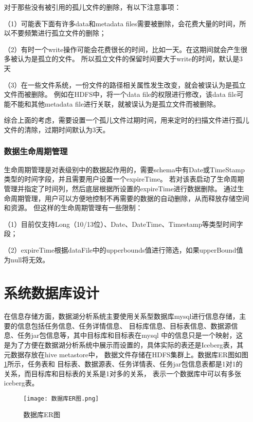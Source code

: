 对于那些没有被引用的孤儿文件的删除，有以下注意事项：

（1）可能表下面有许多data和metadata files需要被删除，会花费大量的时间，所以不要频繁进行孤立文件的删除；

（2）有时一个write操作可能会花费很长的时间，比如一天。在这期间就会产生很多被认为是孤立的文件。
所以孤立文件的保留时间要大于write的时间，默认是3天

（3）在一些文件系统，一份文件的路径相关属性发生改变，就会被误认为是孤立文件而被删除。
例如在HDFS中，将一个data file的权限进行修改，该data file可能不能和其他metadata file进行关联，就被误认为是孤立文件而被删除。

综合上面的考虑，需要设置一个孤儿文件过期时间，用来定时的扫描文件进行孤儿文件的清除，过期时间默认为3天。

\subsubsection{数据生命周期管理}

⽣命周期管理是对表级别中的数据起作用的，需要schema中有Date或TimeStamp类型的时间字段，并且需要用户设置一个expireTime。
若对该表启动了⽣命周期管理并指定了时间列，然后底层根据所设置的expireTime进⾏数据删除。
通过生命周期管理，用户可以方便地控制不再需要的数据的自动删除，从而释放存储空间和资源。
但这样的⽣命周期管理有一些限制：

（1）⽬前仅⽀持Long（10/13位）、Date、DateTime、Timestamp等类型时间字段；

（2）expireTime根据dataFile中的upperbounds值进⾏筛选，如果upperBound值为null将⽆效。

\section{系统数据库设计}

在信息存储方面，数据湖分析系统主要使用关系型数据库mysql进行信息存储，主要的信息包括任务信息、任务详情信息、
目标库信息、目标表信息、数据源信息、任务jar包信息等，其中目标库和目标表在mysql
中的信息只是一个映射，这是为了方便在数据湖分析系统中展示而设置的，具体实际的表还是Iceberg表，其元数据存放在hive metastore中，
数据文件存储在HDFS集群上。数据库ER图如图\ref{fig:数据库ER图}所示，任务表和
目标表、数据源表、任务详情表、任务jar包信息表都是1对1的关系，而目标库和目标表的关系是1对多的关系，
表示一个数据库中可以有多张iceberg表。

\begin{figure}[H]
  \centering
  \texttt{[image: 数据库ER图.png]}
  \caption{数据库ER图}
  \label{fig:数据库ER图}
\end{figure}

